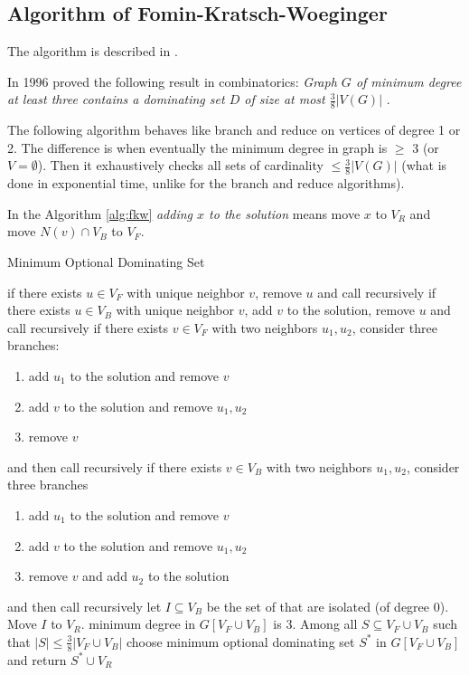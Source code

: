 \subsection{Algorithm of Fomin-Kratsch-Woeginger}
The algorithm is described in \cite{FominKratschWoeginger10.1007/978-3-540-30559-0_21}.
\par In 1996 \citeauthor{reed_1996} proved the following result in combinatorics:
\textit{Graph $G$ of minimum degree at least three contains a dominating set $D$ of size at most $\frac{3}{8}|V(G)|$} \cite{reed_1996}.
\par The following algorithm behaves like branch and reduce on vertices of degree 1 or 2. The difference is when eventually the minimum degree in graph is $\geq$ 3 (or $V = \emptyset$). Then it exhaustively checks all sets of cardinality $\leq \frac{3}{8}|V(G)|$ (what is done in exponential time, unlike for the branch and reduce algorithms).
\par In the Algorithm \ref{alg:fkw} \textit{adding $x$ to the solution} means move $x$ to $V_R$ and move $N(v) \cap V_B$ to $V_F$.
\begin{algorithm}
\caption{Minimum Optional Dominating Set}
\label{alg:fkw}
\begin{algorithmic}[1]
 
\State if there exists $u\in V_F$ with unique neighbor $v$, remove $u$ and call recursively
\State if there exists $u\in V_B$ with unique neighbor $v$, add $v$ to the solution, remove $u$ and call recursively
\State if there exists $v\in V_F$ with two neighbors $u_1, u_2$, consider three branches:
\begin{enumerate}
    \item add $u_1$ to the solution and remove $v$
    \item add $v$ to the solution and remove $u_1, u_2$
    \item remove $v$
\end{enumerate}
and then call recursively
\State if there exists $v\in V_B$ with two neighbors $u_1, u_2$, consider three branches
\begin{enumerate}
    \item add $u_1$ to the solution and remove $v$
    \item add $v$ to the solution and remove $u_1, u_2$
    \item remove $v$ and add $u_2$ to the solution
\end{enumerate}
and then call recursively
\State let $I \subseteq V_B$ be the set of that are isolated (of degree 0). Move $I$ to $V_R$.
\State minimum degree in $G[V_F \cup V_B]$ is 3. Among all $S \subseteq V_F \cup V_B$ such that $|S| \leq \frac{3}{8}|V_F \cup V_B|$ choose minimum optional dominating set $S^*$ in $G[V_F \cup V_B]$ and return $S^* \cup V_R$
\EndProcedure
\end{algorithmic}
\end{algorithm}


